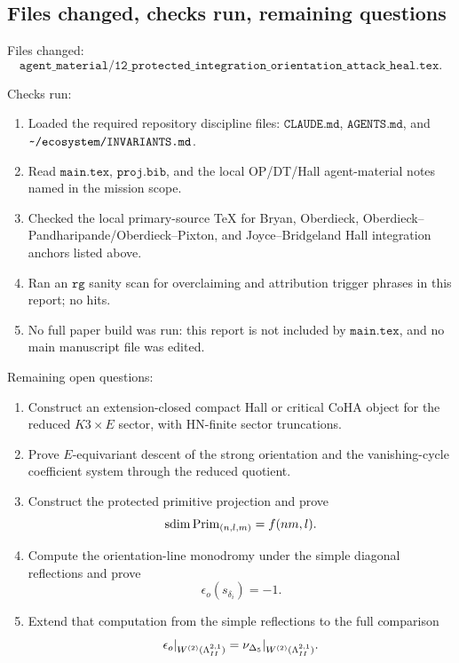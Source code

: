 \subsection{Files changed, checks run, remaining questions}

Files changed:
\[
  \texttt{agent\_material/12\_protected\_integration\_orientation\_attack\_heal.tex}.
\]

Checks run:
\begin{enumerate}
\item Loaded the required repository discipline files:
\(\texttt{CLAUDE.md}\), \(\texttt{AGENTS.md}\), and
\(\texttt{\string~/ecosystem/INVARIANTS.md}\).
\item Read \(\texttt{main.tex}\), \(\texttt{proj.bib}\), and the local
OP/DT/Hall agent-material notes named in the mission scope.
\item Checked the local primary-source TeX for Bryan, Oberdieck,
Oberdieck--Pandharipande/Oberdieck--Pixton, and Joyce--Bridgeland Hall
integration anchors listed above.
\item Ran an \(\texttt{rg}\) sanity scan for overclaiming and attribution
trigger phrases in this report; no hits.
\item No full paper build was run: this report is not included by
\(\texttt{main.tex}\), and no main manuscript file was edited.
\end{enumerate}

Remaining open questions:
\begin{enumerate}
\item Construct an extension-closed compact Hall or critical CoHA object
for the reduced \(K3\times E\) sector, with HN-finite sector
truncations.
\item Prove \(E\)-equivariant descent of the strong orientation and the
vanishing-cycle coefficient system through the reduced quotient.
\item Construct the protected primitive projection and prove
\[
  \operatorname{sdim}\operatorname{Prim}_{(n,l,m)}=f(nm,l).
\]
\item Compute the orientation-line monodromy under the simple diagonal
reflections and prove
\[
  \epsilon_o(s_{\delta_i})=-1.
\]
\item Extend that computation from the simple reflections to the full
comparison
\[
  \epsilon_o|_{W^{(2)}(\Lambda^{2,1}_{II})}
  =
  \nu_{\Delta_5}|_{W^{(2)}(\Lambda^{2,1}_{II})}.
\]
\end{enumerate}
